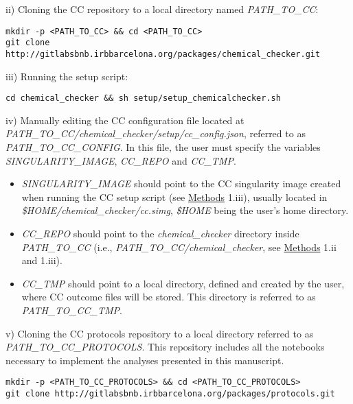 ii) Cloning the CC repository to a local directory named \textit{PATH\_TO\_CC}: \\

\begin{lstlisting}
mkdir -p <PATH_TO_CC> && cd <PATH_TO_CC>
git clone http://gitlabsbnb.irbbarcelona.org/packages/chemical_checker.git
\end{lstlisting}

iii) Running the setup script:  \\

\begin{lstlisting}
cd chemical_checker && sh setup/setup_chemicalchecker.sh
\end{lstlisting}

iv) Manually editing the CC configuration file located at \textit{PATH\_TO\_CC/chemical\_checker/setup/cc\_config.json}, referred to as \textit{PATH\_TO\_CC\_CONFIG}. In this file, the user must specify the variables \textit{SINGULARITY\_IMAGE}, \textit{CC\_REPO} and \textit{CC\_TMP}.
\begin{itemize}
    \item \textit{SINGULARITY\_IMAGE} should point to the CC singularity image created when running the CC setup script (see \hyperref[Protocols_Methods]{Methods} 1.iii), usually located in \textit{\$HOME/chemical\_checker/cc.simg}, \textit{\$HOME} being the user’s home directory.
    \item \textit{CC\_REPO} should point to the \textit{chemical\_checker} directory inside \textit{PATH\_TO\_CC} (i.e., \textit{PATH\_TO\_CC/chemical\_checker}, see \hyperref[Protocols_Methods]{Methods} 1.ii and 1.iii).
    \item \textit{CC\_TMP} should point to a local directory, defined and created by the user, where CC outcome files will be stored. This directory is referred to as \textit{PATH\_TO\_CC\_TMP}.
\end{itemize}

v) Cloning the CC protocols repository to a local directory referred to as \textit{PATH\_TO\_CC\_PROTOCOLS}. This repository includes all the notebooks necessary to implement the analyses presented in this manuscript. \\

\begin{lstlisting}
mkdir -p <PATH_TO_CC_PROTOCOLS> && cd <PATH_TO_CC_PROTOCOLS>
git clone http://gitlabsbnb.irbbarcelona.org/packages/protocols.git
\end{lstlisting}

